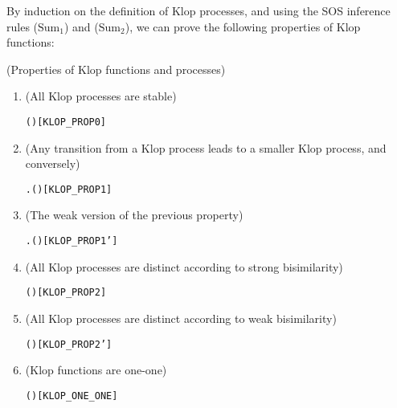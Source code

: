 By induction on the definition of Klop processes,  and using the SOS inference
rules ($\mathrm{Sum}_1$) and ($\mathrm{Sum}_2$), we can  prove
the following properties of Klop functions:
\begin{proposition}{(Properties of Klop functions and processes)}
\begin{enumerate}
\item (All Klop processes are stable)
\begin{alltt}
\HOLTokenTurnstile{}  (  )\hfill[KLOP_PROP0]
\end{alltt}
\item (Any transition from a Klop process leads to a smaller Klop
  process, and conversely)
\begin{alltt}
\HOLTokenTurnstile{}    \HOLTokenTransBegin{} \HOLTokenTransEnd {} \HOLSymConst{\HOLTokenEquiv{}} \HOLSymConst{\HOLTokenExists{}}.  \HOLSymConst{\HOLTokenLt{}}  \HOLSymConst{\HOLTokenConj{}} ( \HOLSymConst{=}   )\hfill{[KLOP_PROP1]}
\end{alltt}
\item (The weak version of the previous property)
\begin{alltt}
\HOLTokenTurnstile{}    \HOLTokenWeakTransBegin{} \HOLTokenWeakTransEnd {} \HOLSymConst{\HOLTokenEquiv{}} \HOLSymConst{\HOLTokenExists{}}.  \HOLSymConst{\HOLTokenLt{}}  \HOLSymConst{\HOLTokenConj{}} ( \HOLSymConst{=}   )\hfill{[KLOP_PROP1']}
\end{alltt}
\item (All Klop processes are distinct according to strong   bisimilarity)
\begin{alltt}
\HOLTokenTurnstile{}  \HOLSymConst{\HOLTokenLt{}}  \HOLSymConst{\HOLTokenImp{}} \HOLSymConst{\HOLTokenNeg{}}(   \HOLSymConst{\HOLTokenStrongEQ}   )\hfill{[KLOP_PROP2]}
\end{alltt}
\item (All Klop processes are distinct according to weak bisimilarity)
\begin{alltt}
\HOLTokenTurnstile{}  \HOLSymConst{\HOLTokenLt{}}  \HOLSymConst{\HOLTokenImp{}} \HOLSymConst{\HOLTokenNeg{}}(   \HOLSymConst{\HOLTokenWeakEQ}   )\hfill{[KLOP_PROP2']}
\end{alltt}
\item (Klop functions are one-one)
\begin{alltt}
\HOLTokenTurnstile{}  ( )\hfill{[KLOP_ONE_ONE]}
\end{alltt}
\end{enumerate}
\end{proposition}
